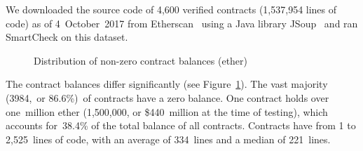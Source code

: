 We downloaded the source code of 4,600 verified contracts (1,537,954
lines of code) as of 4~October~2017 from Etherscan~\cite{EtherscanVerified} using a Java library JSoup~\cite{JSoup} and ran SmartCheck on this dataset.

\begin{figure}
	\caption{Distribution of non-zero contract balances (ether)}
	\centering
	\label{BalancesFigure}
\end{figure}

The contract balances differ significantly (see Figure~\ref{BalancesFigure}).
The vast majority (3984,~or 86.6\%)~of contracts have a zero balance.
One contract holds over one~million ether (1,500,000, or \$440~million at the time of testing), which accounts for~38.4\% of the total balance of all contracts.
Contracts have from 1 to 2,525~lines of code, with an average of 334~lines and a median of 221~lines.

